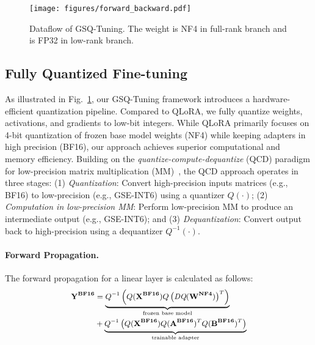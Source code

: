 
\begin{figure}[t]
  \centering
   \texttt{[image: figures/forward\_backward.pdf]}
   \caption{Dataflow of GSQ-Tuning. The weight is NF4 in full-rank branch and is FP32 in low-rank branch.}
   \label{fig:GSQ_tuning}
\vspace{-4mm}
\end{figure}

\subsection{Fully Quantized Fine-tuning}
\label{sec: FQFT}

As illustrated in Fig.~\ref{fig:GSQ_tuning}, our GSQ-Tuning framework introduces a hardware-efficient quantization pipeline. Compared to QLoRA, we fully quantize weights, activations, and gradients to low-bit integers. While QLoRA primarily focuses on 4-bit quantization of frozen base model weights (NF4) while keeping adapters in high precision (BF16), our approach achieves superior computational and memory efficiency. Building on the \textit{quantize-compute-dequantize} (QCD) paradigm for low-precision matrix multiplication (MM)~\citep{jetfire}, the QCD approach operates in three stages: (1) \textit{Quantization}: Convert high-precision inputs matrices (e.g., BF16) to low-precision (e.g., GSE-INT6) using a quantizer $Q(\cdot)$; (2) \textit{Computation in low-precision MM}: Perform low-precision MM to produce an intermediate output (e.g., GSE-INT6); and (3) \textit{Dequantization}: Convert output back to high-precision using a dequantizer $Q^{-1}(\cdot)$. 
\paragraph{Forward Propagation.} The forward propagation for a linear layer is calculated as follows:
\begin{equation*}
\small
\begin{aligned}
\label{forward}
    \mathbf{Y^{BF16}} & = \underbrace{Q^{-1}\left(Q(\mathbf{X^{BF16}}) Q\left(\textit{DQ}(\mathbf{W^{NF4}})\right)^T \right)}_{\text{frozen base model}} \\
    & \hfill + \underbrace{Q^{-1}\left(Q(\mathbf{X^{BF16}})Q(\mathbf{A^{BF16}})^TQ(\mathbf{B^{BF16}})^T \right)}_{\text{trainable adapter}}
\end{aligned}
\end{equation*}
